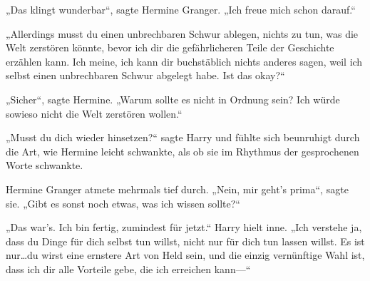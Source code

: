 „Das klingt wunderbar“, sagte Hermine Granger. „Ich freue mich schon darauf.“

„Allerdings musst du einen unbrechbaren Schwur ablegen, nichts zu tun, was die Welt zerstören könnte, bevor ich dir die gefährlicheren Teile der Geschichte erzählen kann. Ich meine, ich kann dir buchstäblich nichts anderes sagen, weil ich selbst einen unbrechbaren Schwur abgelegt habe. Ist das okay?“

„Sicher“, sagte Hermine. „Warum sollte es nicht in Ordnung sein? Ich würde sowieso nicht die Welt zerstören wollen.“

„Musst du dich wieder hinsetzen?“ sagte Harry und fühlte sich beunruhigt durch die Art, wie Hermine leicht schwankte, als ob sie im Rhythmus der gesprochenen Worte schwankte.

Hermine Granger atmete mehrmals tief durch. „Nein, mir geht’s prima“, sagte sie.
„Gibt es sonst noch etwas, was ich wissen sollte?“

„Das war’s. Ich bin fertig, zumindest für jetzt.“
Harry hielt inne.
„Ich verstehe ja, dass du Dinge für dich selbst tun willst, nicht nur für dich tun lassen willst. Es ist nur…du wirst eine ernstere Art von Held sein, und die einzig vernünftige Wahl ist, dass ich dir alle Vorteile gebe, die ich erreichen kann—“

